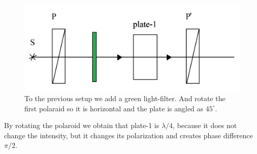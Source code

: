 \begin{minipage}{0.55\textwidth}
    \begin{figure}[h]
    \centering
    \includegraphics[width=1\textwidth]{images/greeeeeen.png}
    \caption{To the previous setup we add a green light-filter. And rotate the first polaraid so it is horizontal and the plate is  angled as $45^\circ$.}
\end{figure}
\end{minipage}
\hfill
\begin{minipage}{0.35\textwidth}
    By rotating the polaroid we obtain that plate-1 is $\lambda/4$, because it does not change the intensity, but it changes its polarization and creates phase difference $\pi/2$.
\end{minipage}

